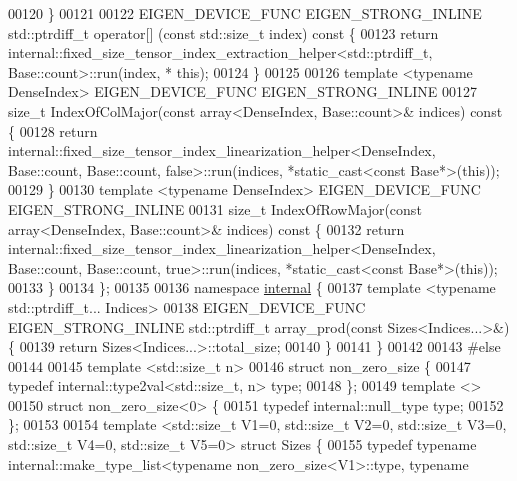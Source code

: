 \begin{DoxyCode}
00120   \}
00121 
00122   EIGEN\_DEVICE\_FUNC EIGEN\_STRONG\_INLINE std::ptrdiff\_t operator[] (\textcolor{keyword}{const} std::size\_t index)\textcolor{keyword}{ const }\{
00123     \textcolor{keywordflow}{return} internal::fixed\_size\_tensor\_index\_extraction\_helper<std::ptrdiff\_t, Base::count>::run(index, *\textcolor{keyword}{
      this});
00124   \}
00125 
00126   \textcolor{keyword}{template} <\textcolor{keyword}{typename} DenseIndex> EIGEN\_DEVICE\_FUNC EIGEN\_STRONG\_INLINE
00127   \textcolor{keywordtype}{size\_t} IndexOfColMajor(\textcolor{keyword}{const} array<DenseIndex, Base::count>& indices)\textcolor{keyword}{ const }\{
00128     \textcolor{keywordflow}{return} internal::fixed\_size\_tensor\_index\_linearization\_helper<DenseIndex, Base::count, Base::count,
       false>::run(indices, *static\_cast<const Base*>(\textcolor{keyword}{this}));
00129   \}
00130   \textcolor{keyword}{template} <\textcolor{keyword}{typename} DenseIndex> EIGEN\_DEVICE\_FUNC EIGEN\_STRONG\_INLINE
00131   \textcolor{keywordtype}{size\_t} IndexOfRowMajor(\textcolor{keyword}{const} array<DenseIndex, Base::count>& indices)\textcolor{keyword}{ const }\{
00132     \textcolor{keywordflow}{return} internal::fixed\_size\_tensor\_index\_linearization\_helper<DenseIndex, Base::count, Base::count,
       true>::run(indices, *static\_cast<const Base*>(\textcolor{keyword}{this}));
00133   \}
00134 \};
00135 
00136 \textcolor{keyword}{namespace }\hyperlink{namespaceinternal}{internal} \{
00137 \textcolor{keyword}{template} <\textcolor{keyword}{typename} std::ptrdiff\_t... Indices>
00138 EIGEN\_DEVICE\_FUNC EIGEN\_STRONG\_INLINE std::ptrdiff\_t array\_prod(\textcolor{keyword}{const} Sizes<Indices...>&) \{
00139   \textcolor{keywordflow}{return} Sizes<Indices...>::total\_size;
00140 \}
00141 \}
00142 
00143 \textcolor{preprocessor}{#else}
00144 
00145 \textcolor{keyword}{template} <std::\textcolor{keywordtype}{size\_t} n>
00146 \textcolor{keyword}{struct }non\_zero\_size \{
00147   \textcolor{keyword}{typedef} internal::type2val<std::size\_t, n> type;
00148 \};
00149 \textcolor{keyword}{template} <>
00150 \textcolor{keyword}{struct }non\_zero\_size<0> \{
00151   \textcolor{keyword}{typedef} internal::null\_type type;
00152 \};
00153 
00154 \textcolor{keyword}{template} <std::\textcolor{keywordtype}{size\_t} V1=0, std::\textcolor{keywordtype}{size\_t} V2=0, std::\textcolor{keywordtype}{size\_t} V3=0, std::\textcolor{keywordtype}{size\_t} V4=0, std::\textcolor{keywordtype}{size\_t} V5=0> \textcolor{keyword}{struct }
      Sizes \{
00155   \textcolor{keyword}{typedef} \textcolor{keyword}{typename} internal::make\_type\_list<typename non\_zero\_size<V1>::type, \textcolor{keyword}{typename} 

\end{DoxyCode}
